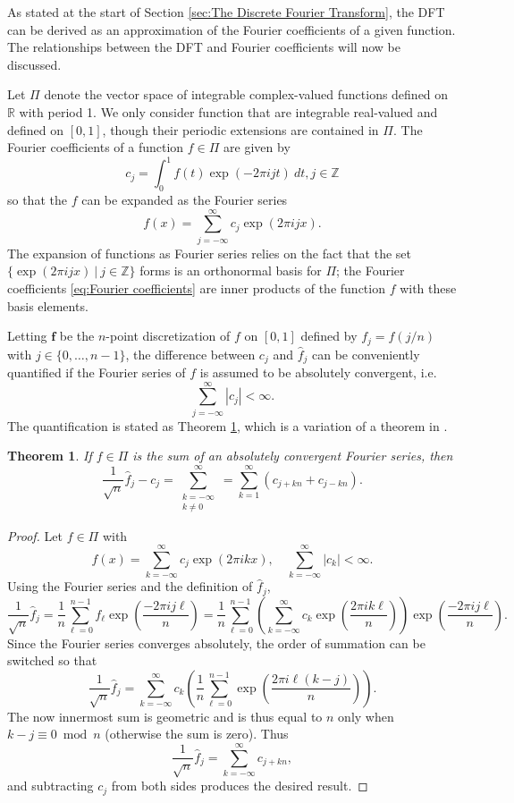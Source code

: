 \documentclass[12pt]{article}
\newtheorem{theorem}{Theorem}[section]
\begin{document}
As stated at the start of Section \ref{sec:The Discrete Fourier Transform}, the DFT can be derived as an approximation of the Fourier coefficients of a given function. The relationships between the DFT and Fourier coefficients will now be discussed. \par 
Let $\Pi$ denote the vector space of integrable complex-valued functions defined on $\mathbb{R}$ with period 1. We only consider function that are integrable real-valued and defined on $[0,1]$, though their periodic extensions are contained in $\Pi$.  The Fourier coefficients of a function $f \in \Pi$ are given by 
\begin{equation}
\label{eq:Fourier coefficients}
c_j = \int_0^1 f(t)\exp(-2\pi{i}jt) \: dt, j \in \mathbb{Z}
\end{equation}
so that the $f$ can be expanded as the Fourier series
\begin{equation}
\label{eq:Fourier series}
f(x) = \sum_{j=-\infty}^{\infty} c_j \exp(2\pi{i}jx).
\end{equation}
The expansion of functions as Fourier series relies on the fact that the set $\{\exp(2\pi{i}jx)\:|\:j\in\mathbb{Z}\}$ forms is an orthonormal basis for $\Pi$; the Fourier coefficients \eqref{eq:Fourier coefficients} are inner products of the function $f$ with these basis elements. \par
Letting $\mathbf{f}$ be the $n$-point discretization of $f$ on $[0,1]$ defined by $f_j = f(j/n)$ with $j \in \{0,\ldots,n-1\}$, the difference between $c_j$ and $\widehat{f}_j$ can be conveniently quantified if the Fourier series of $f$ is assumed to be absolutely convergent, i.e.
\[\sum_{j=-\infty}^{\infty} |c_j| < \infty.\]
The quantification is stated as Theorem \ref{thm:Fourier accuracy}, which is a variation of a theorem in \cite[p.~19]{Henrici3}.
\begin{theorem}
\label{thm:Fourier accuracy}
If $f \in \Pi$ is the sum of an absolutely convergent Fourier series, then
\[\frac{1}{\sqrt{n}}\widehat{f}_j - c_j = \sum_{\substack{
k = -\infty \\
k \neq 0
}}^{\infty} = \sum_{k=1}^{\infty} (c_{j+k{n}} + c_{j-k{n}}).\]
\end{theorem}
\begin{proof}
Let $f \in \Pi$ with
\[f(x) = \sum_{k=-\infty}^{\infty} c_j \exp(2\pi{i}kx), \quad \sum_{k=-\infty}^{\infty} |c_k| < \infty.\]
Using the Fourier series and the definition of $\widehat{f}_j$,
\[\frac{1}{\sqrt{n}}\widehat{f}_j = \frac{1}{n}\sum_{\ell=0}^{n-1} f_{\ell}\exp\left(\frac{-2\pi{ij\ell}}{n}\right) = \frac{1}{n} \sum_{\ell=0}^{n-1} \left(\sum_{k=-\infty}^{\infty} c_k \exp\left(\frac{2\pi{i}k\ell}{n}\right)\right)\exp\left(\frac{-2\pi{ij\ell}}{n}\right).\]
Since the Fourier series converges absolutely, the order of summation can be switched so that
\[\frac{1}{\sqrt{n}}\widehat{f}_j = \sum_{k=-\infty}^{\infty} c_k \left(\frac{1}{n} \sum_{\ell=0}^{n-1} \exp\left(\frac{2\pi{i}\ell(k-j)}{n}\right)\right).\]
The now innermost sum is geometric and is thus equal to $n$ only when $k - j \equiv 0 \bmod n$ (otherwise the sum is zero). Thus
\[\frac{1}{\sqrt{n}}\widehat{f}_j = \sum_{k=-\infty}^{\infty} c_{j+kn},\]
and subtracting $c_j$ from both sides produces the desired result.
\end{proof}
\end{document}
